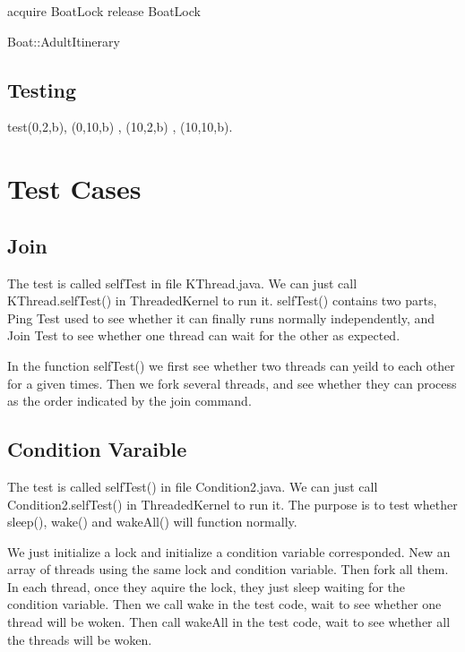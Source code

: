 \documentclass[a4paper,10pt]{article}
\begin{document}
\begin{algorithm}
\DontPrintSemicolon %
acquire BoatLock\;
release BoatLock\;
\caption{Boat::AdultItinerary}
\label{algo:change}
\end{algorithm}
\subsection {Testing}
test(0,2,b), (0,10,b) , (10,2,b) , (10,10,b).

\section{Test Cases}
\subsection{Join}
The test is called selfTest in file KThread.java. We can just call KThread.selfTest() in ThreadedKernel to run it. selfTest() contains two parts, Ping Test used to see whether it can finally runs normally independently, and Join Test to see whether one thread can wait for the other as expected.

In the function selfTest() we first see whether two threads can yeild to each other for a given times. Then we fork several threads, and see whether they can process as the order indicated by the join command.
\subsection{Condition Varaible}

The test is called selfTest() in file Condition2.java. We can just call Condition2.selfTest() in ThreadedKernel to run it. The purpose is to test whether sleep(), wake() and wakeAll() will function normally.

We just initialize a lock and initialize a condition variable corresponded. New an array of threads using the same lock and condition variable. Then fork all them. In each thread, once they aquire the lock, they just sleep waiting for the condition variable. Then we call wake in the test code, wait to see whether one thread will be woken. Then call wakeAll in the test code, wait to see whether all the threads will be woken.
\end{document}
